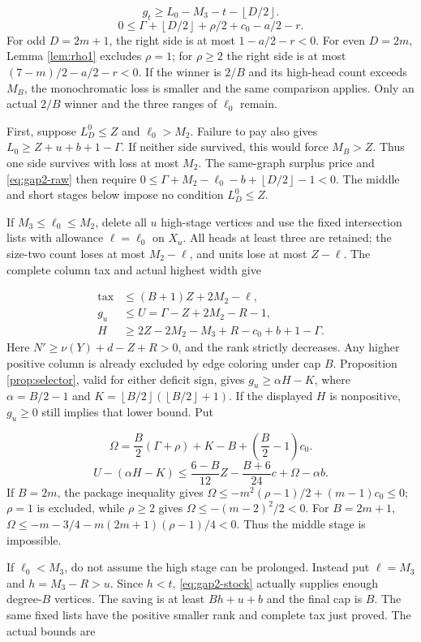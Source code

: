 \documentclass[11pt,a4paper]{article}
\newcommand{\floor}[1]{\left\lfloor#1\right\rfloor}
\theoremstyle{definition}
\begin{document}
\[
g_t\ge L_0-M_3-t-\floor{D/2}.
\]
\[
0\le\Gamma+\floor{D/2}+\rho/2+c_0-a/2-r.
\]
For odd $D=2m+1$, the right side is at most $1-a/2-r<0$.
For even $D=2m$, Lemma \ref{lem:rho1} excludes $\rho=1$;
for $\rho\ge2$ the right side is at most $(7-m)/2-a/2-r<0$.
If the winner is $2/B$ and its high-head count exceeds $M_B$,
the monochromatic loss is smaller and the same comparison applies.
Only an actual $2/B$ winner and the three ranges of $\ell_0$ remain.

First, suppose $L_D^0\le Z$ and $\ell_0>M_2$.
Failure to pay also gives $L_0\ge Z+u+b+1-\Gamma$.
If neither side survived, this would force $M_B>Z$.
Thus one side survives with loss at most $M_2$.
The same-graph surplus price and \eqref{eq:gap2-raw} then require
$0\le\Gamma+M_2-\ell_0-b+\floor{D/2}-1<0$.
The middle and short stages below impose no condition $L_D^0\le Z$.

If $M_3\le\ell_0\le M_2$, delete all $u$ high-stage vertices and
use the fixed intersection lists with allowance $\ell=\ell_0$ on $X_u$.
All heads at least three are retained; the size-two count loses at most
$M_2-\ell$, and units lose at most $Z-\ell$.
The complete column tax and actual highest width give

\[
\begin{split}
\mathrm{tax}&\le(B+1)Z+2M_2-\ell,\\
g_u&\le U=\Gamma-Z+2M_2-R-1,\\
H&\ge2Z-2M_2-M_3+R-c_0+b+1-\Gamma.
\end{split}
\]
Here $N'\ge\nu(Y)+d-Z+R>0$, and the rank strictly decreases.
Any higher positive column is already excluded by edge coloring under cap $B$.
Proposition \ref{prop:selector}, valid for either deficit sign, gives
$g_u\ge\alpha H-K$, where
$\alpha=B/2-1$ and $K=\floor{B/2}(\floor{B/2}+1)$.
If the displayed $H$ is nonpositive, $g_u\ge0$ still implies that lower bound.
Put

\[
\Omega=\frac B2(\Gamma+\rho)+K-B+\left(\frac B2-1\right)c_0.
\]
\[
U-(\alpha H-K)
\le\frac{6-B}{12}Z-\frac{B+6}{24}c+\Omega-\alpha b.
\]
If $B=2m$, the package inequality gives
$\Omega\le-m^2(\rho-1)/2+(m-1)c_0\le0$;
$\rho=1$ is excluded, while $\rho\ge2$ gives
$\Omega\le-(m-2)^2/2<0$.
For $B=2m+1$,
$\Omega\le-m-3/4-m(2m+1)(\rho-1)/4<0$.
Thus the middle stage is impossible.

If $\ell_0<M_3$, do not assume the high stage can be prolonged.
Instead put $\ell=M_3$ and $h=M_3-R>u$.
Since $h<t$, \eqref{eq:gap2-stock} actually supplies enough degree-$B$ vertices.
The saving is at least $Bh+u+b$ and the final cap is $B$.
The same fixed lists have the positive smaller rank and complete tax just proved.
The actual bounds are
\end{document}
